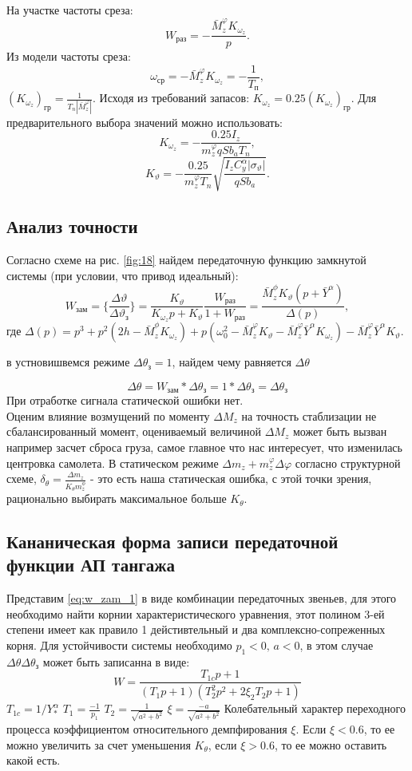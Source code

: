 \documentclass{article}
\begin{document}
На участке частоты среза:
\[
W_{раз} = -\frac{\bar{M}_z^\varphi K_{\omega_z}}{p}.
\]
Из модели частоты среза:
\[
\omega_{ср} = -\bar{M}_z^\varphi K_{\omega_z} = -\frac{1}{T_п},
\]
$(K_{\omega_z})_{гр} = \frac{1}{T_n |\bar{M}_z^\varphi|}.$
Исходя из требований запасов:
$K_{\omega_z} = 0.25 (K_{\omega_z})_{гр}.$
Для предварительного выбора значений можно использовать:
\[
K_{\omega_z} = - \frac{0.25 I_z}{{m}_z^\varphi q S b_a T_n},
\]
\[
K_{\vartheta} = - \frac{0.25}{{m}_z^\varphi T_n} \sqrt{\frac{I_z C_y^\alpha |\sigma_\vartheta|}{q S b_a}}.
\]

\subsection{Анализ точности}
Согласно схеме на рис. \ref{fig:18} найдем передаточную функцию замкнутой системы (при условии, что привод идеальный):
\begin{equation}
W_{зам}= \{\frac{\Delta \vartheta}{\Delta \vartheta_{з}}\} =\frac{K_{\vartheta}}{K_{\omega_z}p +K_{\vartheta}}\frac{W_{раз}}{1 + W_{раз}} =\frac{\bar{M}_z^\phi K_{\vartheta}(p + \bar{Y}^\alpha)}{\Delta(p)},  
\label{eq:w_zam_1}
\end{equation}
где $\Delta(p) = p^3 + p^2(2h - \bar{M}_z^\phi K_{\omega_z}) + p(\omega_0^2 -\bar{M}_z^\varphi K_\vartheta - \bar{M}_z^\varphi \bar{Y}^\alpha K_{\omega_z}) -\bar{M}_z^\varphi \bar{Y}^\alpha K_{\vartheta} $.


в устновишвемся режиме $\Delta \theta_з = 1$, найдем чему равняется $\Delta \theta$

\[
\Delta \theta = W_{зам} * \Delta \theta_з = 1* \Delta \theta_з = \Delta \theta_з
\]
При отработке сигнала статической ошибки нет. \\
Оценим влияние возмущений по моменту $\Delta M_z$ на точность стаблизации не сбалансированный момент, оцениваемый величиной $\Delta M_z$ может быть вызван например засчет сброса груза, самое главное что нас интересует, что изменилась центровка самолета. В статическом режиме $\Delta m_z + m_z^\varphi \Delta \varphi$ согласно структурной схеме, $\delta_\theta =\frac{\Delta m_z}{K_\theta m_z^\phi}$ - это есть наша статическая ошибка, с этой точки зрения, рационально выбирать максимальное больше $K_\theta$.
\subsection{Кананическая форма записи передаточной функции АП тангажа}
Представим \ref{eq:w_zam_1} в виде комбинации передаточных звеньев, для этого необходимо найти корнии характеристического уравнения, этот полином 3-ей степени имеет как правило 1 дейстивтельный и два комплексно-сопреженных корня. Для устойчивости системы необходимо $p_1 < 0, \, a<0$, в этом случае $\Delta \theta \Delta \theta_з$ может быть записанна в виде:
\[
W = \frac{T_{1c} p + 1}{(T_{1}p + 1)(T_2^2 p^2 + 2 \xi_2 T_2 p + 1)}
\]
$T_{1c} = 1/Y_*^\alpha$
$T_1 = \frac{-1}{p_1}$
$T_2 = \frac{1}{\sqrt{a^2 + b^2}}$
$\xi = \frac{-a}{\sqrt{a^2 + b^2}}$
Колебательный характер переходного процесса коэффициентом относительного демпфирования $\xi$. Если $\xi < 0.6$, то ее можно увеличить за счет уменьшения $K_\theta$, если $\xi > 0.6$, то ее можно оставить какой есть.
\end{document}
